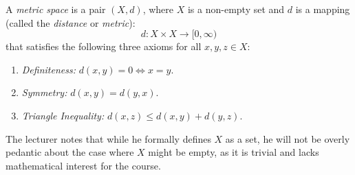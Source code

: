 \begin{nice-box}
\setcounter{theorem}{3}
\begin{definition} \label{def:metric_space}
A \emph{metric space} is a pair $(X, d)$, where $X$ is a non-empty set and $d$ is a mapping (called the \emph{distance} or \emph{metric}):
\[ d: X \times X \to [0, \infty) \]
that satisfies the following three axioms for all $x, y, z \in X$:
\begin{enumerate}
    \setcounter{enumi}{0} \item \emph{Definiteness:} $d(x, y) = 0 \iff x = y$.
    \setcounter{enumi}{1} \item \emph{Symmetry:} $d(x, y) = d(y, x)$.
    \setcounter{enumi}{2} \item \emph{Triangle Inequality:} $d(x, z) \le d(x, y) + d(y, z)$.
\end{enumerate}
\end{definition}

\begin{explanation-of-steps}
The lecturer notes that while he formally defines $X$ as a set, he will not be overly pedantic about the case where $X$ might be empty, as it is trivial and lacks mathematical interest for the course.
\end{explanation-of-steps}
\end{nice-box}

